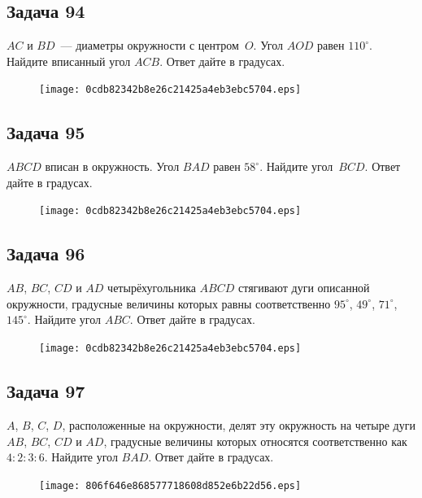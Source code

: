 \documentclass[a4paper,10pt]{article} %
\begin{document}
\begin{spacing}{1.0}
{\subsection*{Задача 94}
 $AC$ и $BD$~--- диаметры окружности с центром~$O$. Угол $AOD$ равен $110^\circ$. Найдите вписанный угол $ACB$. Ответ дайте в градусах.

\vspace{1.5cm}

\begin{figure}{\texttt{[image: 0cdb82342b8e26c21425a4eb3ebc5704.eps]}}\end{figure}
\subsection*{Задача 95}
 $ABCD$ вписан в окружность. Угол $BAD$ равен $58^\circ$. Найдите угол~$BCD$. Ответ дайте в градусах.

\vspace{1.5cm}

\begin{figure}{\texttt{[image: 0cdb82342b8e26c21425a4eb3ebc5704.eps]}}\end{figure}
\subsection*{Задача 96}
 $AB$, $BC$, $CD$ и $AD$ четырёхугольника $ABCD$ стягивают дуги описанной окружности, градусные величины которых равны соответственно $95^\circ$, $49^\circ$, $71^\circ$, $145^\circ$. Найдите угол $ABC$. Ответ дайте в градусах.

\vspace{1.5cm}

\begin{figure}{\texttt{[image: 0cdb82342b8e26c21425a4eb3ebc5704.eps]}}\end{figure}
\subsection*{Задача 97}
 $A$, $B$, $C$, $D$, расположенные на окружности, делят эту окружность на четыре дуги $AB$, $BC$, $CD$ и $AD$, градусные величины которых относятся соответственно как ${4 : 2 : 3 : 6}$. Найдите угол $BAD$. Ответ дайте в градусах.

\vspace{1.5cm}

\begin{figure}{\texttt{[image: 806f646e868577718608d852e6b22d56.eps]}}\end{figure}
}
\end{spacing}
\end{document}
